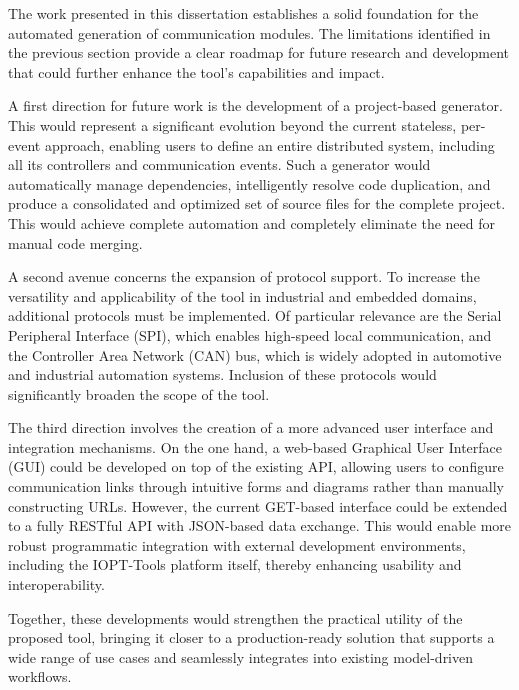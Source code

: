 The work presented in this dissertation establishes a solid foundation for the automated generation of communication modules. The limitations identified in the previous section provide a clear roadmap for future research and development that could further enhance the tool's capabilities and impact. 

A first direction for future work is the development of a project-based generator. This would represent a significant evolution beyond the current stateless, per-event approach, enabling users to define an entire distributed system, including all its controllers and communication events. Such a generator would automatically manage dependencies, intelligently resolve code duplication, and produce a consolidated and optimized set of source files for the complete project. This would achieve complete automation and completely eliminate the need for manual code merging.

A second avenue concerns the expansion of protocol support. To increase the versatility and applicability of the tool in industrial and embedded domains, additional protocols must be implemented. Of particular relevance are the Serial Peripheral Interface (SPI), which enables high-speed local communication, and the Controller Area Network (CAN) bus, which is widely adopted in automotive and industrial automation systems. Inclusion of these protocols would significantly broaden the scope of the tool.

The third direction involves the creation of a more advanced user interface and integration mechanisms. On the one hand, a web-based Graphical User Interface (GUI) could be developed on top of the existing API, allowing users to configure communication links through intuitive forms and diagrams rather than manually constructing URLs. However, the current GET-based interface could be extended to a fully RESTful API with JSON-based data exchange. This would enable more robust programmatic integration with external development environments, including the IOPT-Tools platform itself, thereby enhancing usability and interoperability.

Together, these developments would strengthen the practical utility of the proposed tool, bringing it closer to a production-ready solution that supports a wide range of use cases and seamlessly integrates into existing model-driven workflows.

